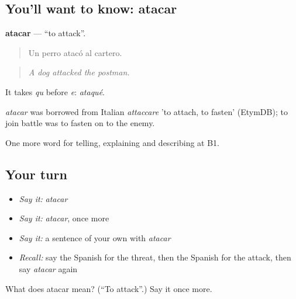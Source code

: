 \subsection*{You'll want to know: atacar}
\textbf{atacar} — \textquotedblleft{}to attack\textquotedblright{}.

\begin{quote}
Un perro atacó al cartero.
\end{quote}

\begin{quote}
\emph{A dog attacked the postman.}
\end{quote}

It takes \emph{qu} before \emph{e}: \emph{ataqué}.

\begin{cousinweb}
\emph{atacar} was borrowed from Italian \emph{attaccare} 'to attach, to fasten' (EtymDB); to join battle was to fasten on to the enemy.
\end{cousinweb}

\begin{grammarlens}[title={What you've built}]
One more word for telling, explaining and describing at B1.
\end{grammarlens}

\subsection*{Your turn}
\begin{itemize}
\raggedright
  \item \emph{Say it:} \emph{atacar}
  \item \emph{Say it:} \emph{atacar}, once more
  \item \emph{Say it:} a sentence of your own with \emph{atacar}
  \item \emph{Recall:} say the Spanish for the threat, then the Spanish for the attack, then say \emph{atacar} again
\end{itemize}

\begin{tcolorbox}[breakable,colback=teal!4,colframe=teal!35!black,title={Before you move on}]
What does atacar mean? (\textquotedblleft{}To attack\textquotedblright{}.) Say it once more.
\end{tcolorbox}
